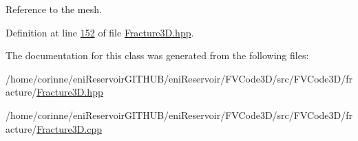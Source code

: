 Reference to the mesh. 



Definition at line \hyperlink{Fracture3D_8hpp_source_l00152}{152} of file \hyperlink{Fracture3D_8hpp_source}{Fracture3\+D.\+hpp}.



The documentation for this class was generated from the following files\+:\begin{DoxyCompactItemize}
\item 
/home/corinne/eni\+Reservoir\+G\+I\+T\+H\+U\+B/eni\+Reservoir/\+F\+V\+Code3\+D/src/\+F\+V\+Code3\+D/fracture/\hyperlink{Fracture3D_8hpp}{Fracture3\+D.\+hpp}\item 
/home/corinne/eni\+Reservoir\+G\+I\+T\+H\+U\+B/eni\+Reservoir/\+F\+V\+Code3\+D/src/\+F\+V\+Code3\+D/fracture/\hyperlink{Fracture3D_8cpp}{Fracture3\+D.\+cpp}\end{DoxyCompactItemize}
